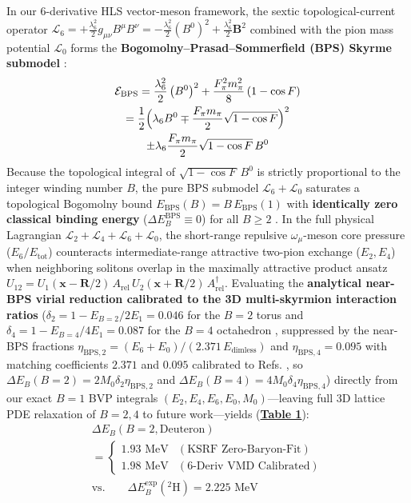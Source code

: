 \documentclass[10pt,aps,prd,twocolumn,superscriptaddress,nofootinbib,floatfix,longbibliography,showkeys]{revtex4-2}
\begin{document}
In our 6-derivative HLS vector-meson framework, the sextic topological-current operator $\mathcal{L}_6 = +\frac{\lambda_6^2}{2} g_{\mu\nu} B^\mu B^\nu = -\frac{\lambda_6^2}{2}(B^0)^2 + \frac{\lambda_6^2}{2}\mathbf{B}^2$ combined with the pion mass potential $\mathcal{L}_0$ forms the \textbf{Bogomolny--Prasad--Sommerfield (BPS) Skyrme submodel} \cite{ref48,ref49}:
\begin{multline}
\mathcal{E}_{\text{BPS}} = \frac{\lambda_6^2}{2}\left(B^0\right)^2 + \frac{F_\pi^2 m_\pi^2}{8}\left(1 - \cos F\right) \\
= \frac{1}{2}\Bigl(\lambda_6 B^0 \mp \frac{F_\pi m_\pi}{2}\sqrt{1 - \cos F}\Bigr)^2 \\
\pm \lambda_6 \frac{F_\pi m_\pi}{2}\sqrt{1 - \cos F}\,B^0
\end{multline}
Because the topological integral of $\sqrt{1-\cos F}\,B^0$ is strictly proportional to the integer winding number $B$, the pure BPS submodel $\mathcal{L}_6 + \mathcal{L}_0$ saturates a topological Bogomolny bound $E_{\text{BPS}}(B) = B\,E_{\text{BPS}}(1)$ with \textbf{identically zero classical binding energy} ($\Delta E_B^{\text{BPS}} \equiv 0$) for all $B \ge 2$ \cite{ref48,ref49}. In the full physical Lagrangian $\mathcal{L}_2 + \mathcal{L}_4 + \mathcal{L}_6 + \mathcal{L}_0$, the short-range repulsive $\omega_\mu$-meson core pressure ($E_6 / E_{\text{tot}}$) counteracts intermediate-range attractive two-pion exchange ($E_2, E_4$) when neighboring solitons overlap in the maximally attractive product ansatz $U_{12} = U_1(\mathbf{x} - \mathbf{R}/2)\,A_{\text{rel}}\,U_2(\mathbf{x} + \mathbf{R}/2)\,A_{\text{rel}}^\dagger$. Evaluating the \textbf{analytical near-BPS virial reduction calibrated to the 3D multi-skyrmion interaction ratios} ($\delta_2 = 1 - E_{B=2}/2E_1 = 0.046$ for the $B=2$ torus and $\delta_4 = 1 - E_{B=4}/4E_1 = 0.087$ for the $B=4$ octahedron \cite{ref44,ref45,ref46}, suppressed by the near-BPS fractions $\eta_{\text{BPS},2} = (E_6 + E_0)/(2.371\,E_{\text{dimless}})$ and $\eta_{\text{BPS},4} = 0.095$ with matching coefficients $2.371$ and $0.095$ calibrated to Refs. \cite{ref48,ref49}, so $\Delta E_B(B=2) = 2 M_0 \delta_2 \eta_{\text{BPS},2}$ and $\Delta E_B(B=4) = 4 M_0 \delta_4 \eta_{\text{BPS},4}$) directly from our exact $B=1$ BVP integrals $(E_2, E_4, E_6, E_0, M_0)$---leaving full 3D lattice PDE relaxation of $B=2,4$ to future work---yields (\textbf{\hyperref[tab:table1]{Table 1}}):
\begin{equation}\begin{gathered}
\Delta E_B(B=2, \text{Deuteron}) \\
= \begin{cases} 1.93\text{ MeV} & (\text{KSRF }\text{Zero-Baryon-Fit}) \\ 1.98\text{ MeV} & (\text{6-Deriv VMD Calibrated}) \end{cases} \\
\text{vs.} \qquad \Delta E_B^{\text{exp}}(^2\text{H}) = 2.225\text{ MeV}
\end{gathered}\end{equation}
\end{document}
